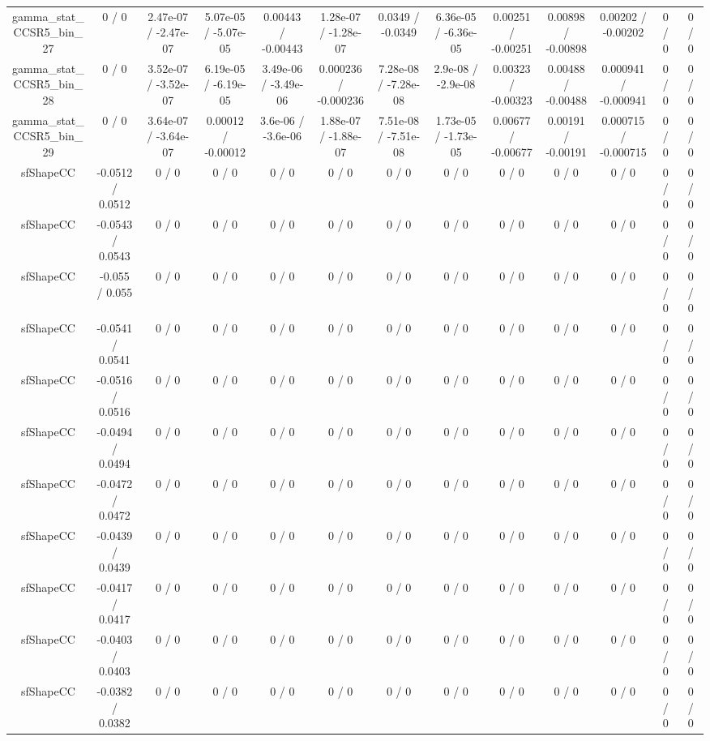 \documentclass[10pt]{article}
\begin{document}
\begin{table}[htbp]
\begin{center}
\begin{tabular}{|c|c|c|c|c|c|c|c|c|c|c|c|c|}
  gamma_stat_CCSR5_bin_27 & 0 / 0 & 2.47e-07 / -2.47e-07 & 5.07e-05 / -5.07e-05 & 0.00443 / -0.00443 & 1.28e-07 / -1.28e-07 & 0.0349 / -0.0349 & 6.36e-05 / -6.36e-05 & 0.00251 / -0.00251 & 0.00898 / -0.00898 & 0.00202 / -0.00202 & 0 / 0 & 0 / 0 \\ 
  gamma_stat_CCSR5_bin_28 & 0 / 0 & 3.52e-07 / -3.52e-07 & 6.19e-05 / -6.19e-05 & 3.49e-06 / -3.49e-06 & 0.000236 / -0.000236 & 7.28e-08 / -7.28e-08 & 2.9e-08 / -2.9e-08 & 0.00323 / -0.00323 & 0.00488 / -0.00488 & 0.000941 / -0.000941 & 0 / 0 & 0 / 0 \\ 
  gamma_stat_CCSR5_bin_29 & 0 / 0 & 3.64e-07 / -3.64e-07 & 0.00012 / -0.00012 & 3.6e-06 / -3.6e-06 & 1.88e-07 / -1.88e-07 & 7.51e-08 / -7.51e-08 & 1.73e-05 / -1.73e-05 & 0.00677 / -0.00677 & 0.00191 / -0.00191 & 0.000715 / -0.000715 & 0 / 0 & 0 / 0 \\ 
  sfShapeCC & -0.0512 / 0.0512 & 0 / 0 & 0 / 0 & 0 / 0 & 0 / 0 & 0 / 0 & 0 / 0 & 0 / 0 & 0 / 0 & 0 / 0 & 0 / 0 & 0 / 0 \\ 
  sfShapeCC & -0.0543 / 0.0543 & 0 / 0 & 0 / 0 & 0 / 0 & 0 / 0 & 0 / 0 & 0 / 0 & 0 / 0 & 0 / 0 & 0 / 0 & 0 / 0 & 0 / 0 \\ 
  sfShapeCC & -0.055 / 0.055 & 0 / 0 & 0 / 0 & 0 / 0 & 0 / 0 & 0 / 0 & 0 / 0 & 0 / 0 & 0 / 0 & 0 / 0 & 0 / 0 & 0 / 0 \\ 
  sfShapeCC & -0.0541 / 0.0541 & 0 / 0 & 0 / 0 & 0 / 0 & 0 / 0 & 0 / 0 & 0 / 0 & 0 / 0 & 0 / 0 & 0 / 0 & 0 / 0 & 0 / 0 \\ 
  sfShapeCC & -0.0516 / 0.0516 & 0 / 0 & 0 / 0 & 0 / 0 & 0 / 0 & 0 / 0 & 0 / 0 & 0 / 0 & 0 / 0 & 0 / 0 & 0 / 0 & 0 / 0 \\ 
  sfShapeCC & -0.0494 / 0.0494 & 0 / 0 & 0 / 0 & 0 / 0 & 0 / 0 & 0 / 0 & 0 / 0 & 0 / 0 & 0 / 0 & 0 / 0 & 0 / 0 & 0 / 0 \\ 
  sfShapeCC & -0.0472 / 0.0472 & 0 / 0 & 0 / 0 & 0 / 0 & 0 / 0 & 0 / 0 & 0 / 0 & 0 / 0 & 0 / 0 & 0 / 0 & 0 / 0 & 0 / 0 \\ 
  sfShapeCC & -0.0439 / 0.0439 & 0 / 0 & 0 / 0 & 0 / 0 & 0 / 0 & 0 / 0 & 0 / 0 & 0 / 0 & 0 / 0 & 0 / 0 & 0 / 0 & 0 / 0 \\ 
  sfShapeCC & -0.0417 / 0.0417 & 0 / 0 & 0 / 0 & 0 / 0 & 0 / 0 & 0 / 0 & 0 / 0 & 0 / 0 & 0 / 0 & 0 / 0 & 0 / 0 & 0 / 0 \\ 
  sfShapeCC & -0.0403 / 0.0403 & 0 / 0 & 0 / 0 & 0 / 0 & 0 / 0 & 0 / 0 & 0 / 0 & 0 / 0 & 0 / 0 & 0 / 0 & 0 / 0 & 0 / 0 \\ 
  sfShapeCC & -0.0382 / 0.0382 & 0 / 0 & 0 / 0 & 0 / 0 & 0 / 0 & 0 / 0 & 0 / 0 & 0 / 0 & 0 / 0 & 0 / 0 & 0 / 0 & 0 / 0 \\ 

\end{tabular}
\end{center}
\end{table}
\end{document}
